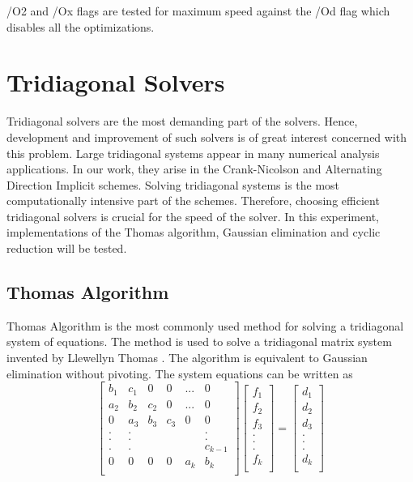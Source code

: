 \documentclass[12pt, oneside]{book}
\theoremstyle{plain}
\theoremstyle{definition}
\begin{document}
/O2 and /Ox flags are tested for maximum speed against the /Od flag which disables all the optimizations.
 
\section{Tridiagonal Solvers}
Tridiagonal solvers are the most demanding part of the solvers. Hence, development and improvement of such solvers is of great interest \cite{terekhov} \cite{chavez} \cite{hofen} \cite{austin} \cite{fpga} concerned with this problem.  Large tridiagonal systems appear in many numerical analysis applications. In our work, they arise in the Crank-Nicolson and Alternating Direction Implicit schemes.  Solving tridiagonal systems is the most computationally intensive part of the schemes. Therefore, choosing efficient tridiagonal solvers is crucial for the speed of the solver. In this experiment, implementations of the Thomas algorithm, Gaussian elimination and cyclic reduction will be tested.

\subsection{Thomas Algorithm}
Thomas Algorithm is the most commonly used method for solving a tridiagonal system of equations. The method is used to solve a tridiagonal matrix system invented by Llewellyn Thomas \cite{thomas}. The algorithm is equivalent to Gaussian elimination without pivoting. The system equations can be written as
$$
\begin{bmatrix}  
b_1 & c_1 & 0 & 0 & ... & 0 \\ 
a_2 & b_2 & c_2 & 0 & ... & 0 \\ 
0 & a_3 & b_3 & c_3 & 0 & 0 \\ 
. & . &  &  &  & . \\ 
. & . &  &  &  & . \\ 
. & . &  &  &  & c_{k-1} \\ 
0 & 0 & 0 & 0 & a_k & b_k \\ 
\end{bmatrix} \begin{bmatrix}  
f_1 \\ 
f_2 \\ 
f_3 \\ 
.\\ 
.\\ 
.\\ 
f_k \\ 
\end{bmatrix} = \begin{bmatrix} 
d_1 \\ 
d_2 \\ 
d_3 \\ 
.\\ 
.\\ 
.\\ 
d_k \\ 
\end{bmatrix}
$$
\end{document}
